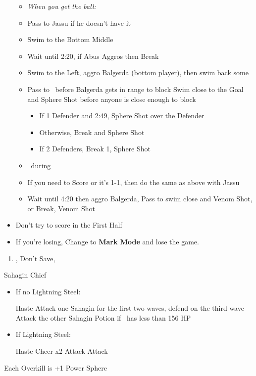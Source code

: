 \begin{blitzball}
\begin{itemize}
\begin{itemize}
			      \item \textit{When you get the ball:}
			      \item Pass to Jassu if he doesn't have it
			      \item Swim to the Bottom Middle
			      \item Wait until 2:20, if Abus Aggros then Break
			      \item Swim to the Left, aggro Balgerda (bottom player), then swim back some
			      \item Pass to \tidus\ before Balgerda gets in range to block
			            \tidusf Swim close to the Goal and Sphere Shot before anyone is close enough to block
			            \begin{itemize}
				            \item If 1 Defender and 2:49, Sphere Shot over the Defender
				            \item Otherwise, Break and Sphere Shot
				            \item If 2 Defenders, Break 1, Sphere Shot
			            \end{itemize}
			      \item \sd\ during \wakka\ \cs
			      \item If you need to Score or it's 1-1, then do the same as above with Jassu
			      \item Wait until 4:20 then aggro Balgerda, Pass to \wakka
			            \wakkaf swim close and Venom Shot, or Break, Venom Shot
		      \end{itemize}
		\item Don't try to score in the First Half
		\item If you're losing, Change to \textbf{Mark Mode} and lose the game.
	\end{itemize}
\end{blitzball}
\begin{enumerate}[resume]
	\item \sd, Don't Save, \cs[1:00]
\end{enumerate}
\vfill
\begin{battle}{Sahagin Chief}
	\begin{itemize}
		\item{If no Lightning Steel:}
		      \begin{itemize}
			      \tidusf Haste \tidus
			      \wakkaf Attack one Sahagin for the first two waves, defend on the third wave
			      \tidusf Attack the other Sahagin
			      \wakkaf Potion if \tidus\ has less than 156 HP
		      \end{itemize}
		\item{If Lightning Steel:}
		      \begin{itemize}
			      \tidusf Haste \tidus
			      \tidusf Cheer x2
			      \wakkaf Attack
			      \tidusf Attack
		      \end{itemize}
	\end{itemize}
	Each Overkill is +1 Power Sphere
\end{battle}

